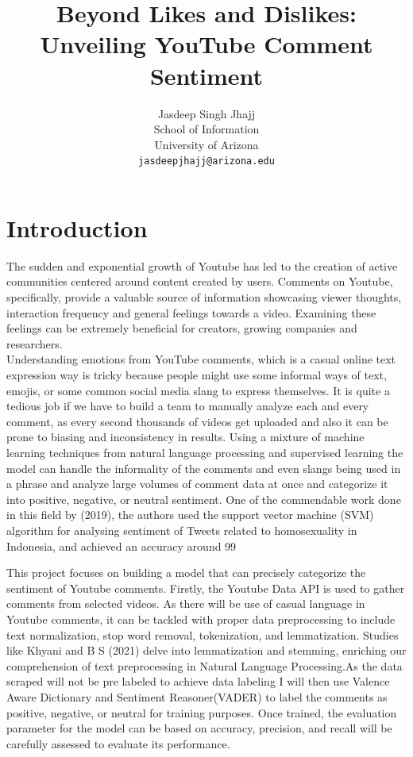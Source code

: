 \documentclass[11pt,article,oneside]{article}
\title{Beyond Likes and Dislikes: Unveiling YouTube Comment Sentiment}
\author{%
    Jasdeep Singh Jhajj\\
    School of Information \\
    University of Arizona\\
    \texttt{jasdeepjhajj@arizona.edu}
}
\begin{document}
\maketitle

\section{Introduction}
The sudden and exponential growth of Youtube has led to the creation of active communities centered around content created by users. Comments on Youtube, specifically, provide a valuable source of information showcasing viewer thoughts, interaction frequency and general feelings towards a video. Examining these feelings can be extremely beneficial for creators, growing companies and researchers. \\

Understanding emotions from YouTube comments, which is a casual online text expression way is tricky because people might use some informal ways of text, emojis, or some common social media slang to express themselves. It is quite a tedious job if we have to build a team to manually analyze each and every comment, as every second thousands of videos get uploaded and also it can be prone to biasing and inconsistency in results. Using a mixture of machine learning techniques from natural language processing and supervised learning\citep{10.1007/978-981-13-6459-4_16} the model can handle the informality of the comments and even slangs being used in a phrase and analyze large volumes of comment data at once and categorize it into positive, negative, or neutral sentiment. One of the commendable work done in this field by \citet{Makhmudah}(2019), the authors used the support vector machine (SVM) algorithm for analysing sentiment of Tweets related to homosexuality in Indonesia, and achieved an accuracy around 99%

This project focuses on building a model that can precisely categorize the sentiment of Youtube comments. Firstly, the Youtube Data API\citep{youtubeApiUsage} is used to gather comments from selected videos. As there will be use of casual language in Youtube comments, it can be tackled with proper data preprocessing to include text normalization, stop word removal, tokenization, and lemmatization\citep{Qi2023}. Studies like Khyani and B S (2021)\citep{khyaniArticle} delve into lemmatization and stemming, enriching our comprehension of text preprocessing in Natural Language Processing.As the data scraped will not be pre labeled to achieve data labeling I will then use Valence Aware Dictionary and Sentiment Reasoner(VADER)\citep{vaderUsage} to label the comments as positive, negative, or neutral for training purposes. Once trained, the evaluation parameter for the model can be based on accuracy, precision, and recall will be carefully assessed to evaluate its performance. \\
\end{document}
